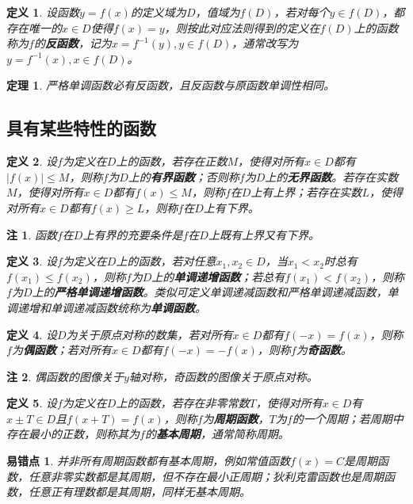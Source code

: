 \documentclass[11pt, a4paper, openany]{article}
\newtheorem{definition}{定义}[section]
\newtheorem{theorem}{定理}[section]
\newtheorem{remark}{注}[section]
\newtheorem{errorpoint}{易错点}[section]
\begin{document}
\begin{definition}
设函数$y=f(x)$的定义域为$D$，值域为$f(D)$，若对每个$y\in f(D)$，都存在唯一的$x\in D$使得$f(x)=y$，则按此对应法则得到的定义在$f(D)$上的函数称为$f$的\textbf{反函数}，记为$x=f^{-1}(y), y\in f(D)$，通常改写为$y=f^{-1}(x), x\in f(D)$。
\end{definition}

\begin{theorem}
严格单调函数必有反函数，且反函数与原函数单调性相同。
\end{theorem}

\subsection{具有某些特性的函数}
\begin{definition}
设$f$为定义在$D$上的函数，若存在正数$M$，使得对所有$x\in D$都有$|f(x)|\leq M$，则称$f$为$D$上的\textbf{有界函数}；否则称$f$为$D$上的\textbf{无界函数}。若存在实数$M$，使得对所有$x\in D$都有$f(x)\leq M$，则称$f$在$D$上有上界；若存在实数$L$，使得对所有$x\in D$都有$f(x)\geq L$，则称$f$在$D$上有下界。
\end{definition}

\begin{remark}
函数$f$在$D$上有界的充要条件是$f$在$D$上既有上界又有下界。
\end{remark}

\begin{definition}
设$f$为定义在$D$上的函数，若对任意$x_1,x_2\in D$，当$x_1<x_2$时总有$f(x_1)\leq f(x_2)$，则称$f$为$D$上的\textbf{单调递增函数}；若总有$f(x_1)<f(x_2)$，则称$f$为$D$上的\textbf{严格单调递增函数}。类似可定义单调递减函数和严格单调递减函数，单调递增和单调递减函数统称为\textbf{单调函数}。
\end{definition}

\begin{definition}
设$D$为关于原点对称的数集，若对所有$x\in D$都有$f(-x)=f(x)$，则称$f$为\textbf{偶函数}；若对所有$x\in D$都有$f(-x)=-f(x)$，则称$f$为\textbf{奇函数}。
\end{definition}

\begin{remark}
偶函数的图像关于$y$轴对称，奇函数的图像关于原点对称。
\end{remark}

\begin{definition}
设$f$为定义在$D$上的函数，若存在非零常数$T$，使得对所有$x\in D$有$x\pm T\in D$且$f(x+T)=f(x)$，则称$f$为\textbf{周期函数}，$T$为$f$的一个周期；若周期中存在最小的正数，则称其为$f$的\textbf{基本周期}，通常简称周期。
\end{definition}

\begin{errorpoint}
并非所有周期函数都有基本周期，例如常值函数$f(x)=C$是周期函数，任意非零实数都是其周期，但不存在最小正周期；狄利克雷函数也是周期函数，任意正有理数都是其周期，同样无基本周期。
\end{errorpoint}
\end{document}
